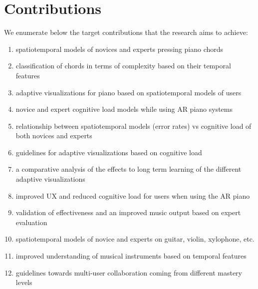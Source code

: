 \documentclass[manuscript,screen]{acmart}
\begin{document}
\section{Contributions}
\label{sec:contri}
We enumerate below the target contributions that the research aims to achieve: 
\begin{enumerate}
    \item spatiotemporal models of novices and experts pressing piano chords
    \item classification of chords in terms of complexity based on their temporal features
    \item adaptive visualizations for piano based on spatiotemporal models of users
    \item novice and expert cognitive load models while using AR piano systems
    \item relationship between spatiotemporal models (error rates) vs cognitive load of both novices and experts
    \item guidelines for adaptive visualizations based on cognitive load
    \item a comparative analysis of the effects to long term learning of the different adaptive visualizations
    \item improved UX and reduced cognitive load for users when using the AR piano
    \item validation of effectiveness and an improved music output based on expert evaluation
    \item spatiotemporal models of novice and experts on guitar, violin, xylophone, etc.
    \item improved understanding of musical instruments based on temporal features
    \item guidelines towards multi-user collaboration coming from different mastery levels
\end{enumerate}
\end{document}
